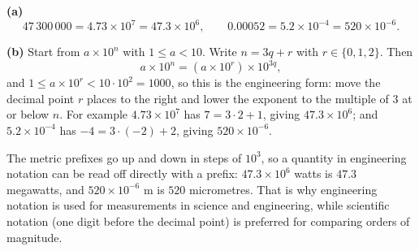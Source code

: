 \textbf{(a)}
\[47\,300\,000=4.73\times10^7=47.3\times10^6,\qquad0.00052=5.2\times10^{-4}=520\times10^{-6}.\]

\textbf{(b)} Start from $a\times10^n$ with $1\le a<10$. Write $n=3q+r$ with $r\in\{0,1,2\}$. Then
\[a\times10^n=\left(a\times10^r\right)\times10^{3q},\]
and $1\le a\times10^r<10\cdot10^2=1000$, so this is the engineering form: move the decimal point $r$ places to the right and lower the exponent to the multiple of $3$ at or below $n$. For example $4.73\times10^7$ has $7=3\cdot2+1$, giving $47.3\times10^6$; and $5.2\times10^{-4}$ has $-4=3\cdot(-2)+2$, giving $520\times10^{-6}$.

The metric prefixes go up and down in steps of $10^3$, so a quantity in engineering notation can be read off directly with a prefix: $47.3\times10^6$ watts is $47.3$ megawatts, and $520\times10^{-6}$ m is $520$ micrometres. That is why engineering notation is used for measurements in science and engineering, while scientific notation (one digit before the decimal point) is preferred for comparing orders of magnitude.
